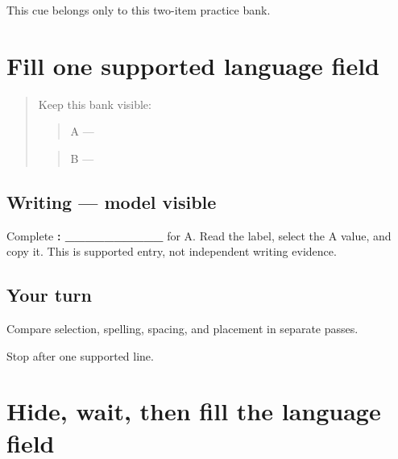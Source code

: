 \begin{tcolorbox}[breakable,colback=teal!4,colframe=teal!35!black,title={Before you move on}]
This cue belongs only to this two-item practice bank.
\end{tcolorbox}
\section[\texorpdfstring{\pa{ਭਾਸ਼ਾ}: \_\_\_\_\_\_\_\_\_\_ (language field)}{ਭਾਸ਼ਾ: \_\_\_\_\_\_\_\_\_\_ (language field)}]{Fill one supported language field}

\label{lesson:PA-W03-language-supported}



\begin{quote}
Keep this bank visible:

\begin{quote}
A — \textbf{}
\end{quote}

\begin{quote}
B — \textbf{}
\end{quote}
\end{quote}

\subsection*{Writing — model visible}
Complete \textbf{: \_\_\_\_\_\_\_\_\_\_} for A. Read the label, select the A value, and copy it. This is supported entry, not independent writing evidence.

\subsection*{Your turn}
Compare selection, spelling, spacing, and placement in separate passes.

\begin{tcolorbox}[breakable,colback=teal!4,colframe=teal!35!black,title={Before you move on}]
Stop after one supported line.
\end{tcolorbox}
\section[\texorpdfstring{\pa{ਭਾਸ਼ਾ}: \_\_\_\_\_\_\_\_\_\_ (language field …)}{ਭਾਸ਼ਾ: \_\_\_\_\_\_\_\_\_\_ (language field …)}]{Hide, wait, then fill the language field}

\label{lesson:PA-W03-language-delayed}




